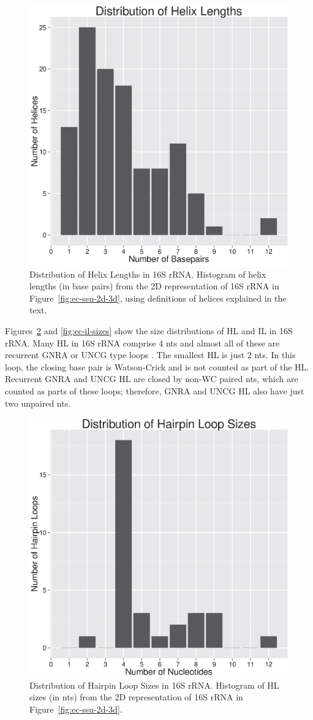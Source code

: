 \begin{figure}
  \includegraphics[width=0.5\linewidth]{chapter-1/figs/helix-lengths.eps}
  \caption{Distribution of Helix Lengths in 16S rRNA. Histogram of helix lengths
    (in base pairs) from the 2D representation of 16S rRNA in
  Figure~\ref{fig:ec-ssu-2d-3d}, using definitions of helices explained in the
text.}
  \label{fig:ec-helix-lengths}
\end{figure}

Figures~\ref{fig:ec-hl-sizes} and \ref{fig:ec-il-sizes} show the size
distributions of HL and IL in 16S rRNA. Many HL in 16S rRNA comprise 4 nts and
almost all of these are recurrent GNRA or UNCG type loops \cite{Woese1990a}. The
smallest HL is just 2 nts. In this loop, the closing base pair is Watson-Crick
and is not counted as part of the HL. Recurrent GNRA and UNCG HL are closed by
non-WC paired nts, which are counted as parts of these loops; therefore, GNRA
and UNCG HL also have just two unpaired nts. 

\begin{figure}
  \includegraphics[width=0.5\linewidth]{chapter-1/figs/hl-sizes}
  \caption{Distribution of Hairpin Loop Sizes in 16S rRNA. Histogram of HL sizes
    (in nts) from the 2D representation of 16S rRNA in
  Figure~\ref{fig:ec-ssu-2d-3d}.}
  \label{fig:ec-hl-sizes}
\end{figure}


